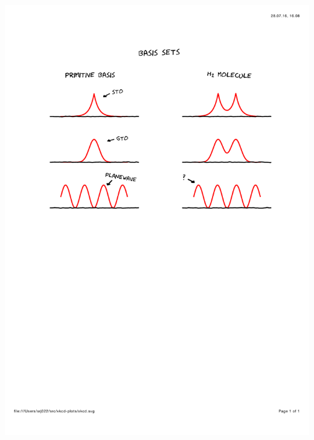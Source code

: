 \begin{frame}
\begin{center}
    \includegraphics[scale=0.6, clip, viewport = 50 435 550 515]{figures/basis_set_3.pdf}
    \end{center}
\end{frame}

